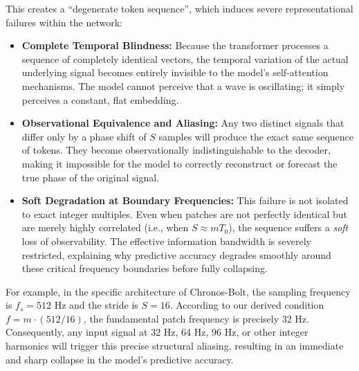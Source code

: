 This creates a ``degenerate token sequence'', which induces severe representational failures within the network:

\begin{itemize}
    \item \textbf{Complete Temporal Blindness:} Because the transformer processes a sequence of completely identical vectors, the temporal variation of the actual underlying signal becomes entirely invisible to the model's self-attention mechanisms. The model cannot perceive that a wave is oscillating; it simply perceives a constant, flat embedding.
    \item \textbf{Observational Equivalence and Aliasing:} Any two distinct signals that differ only by a phase shift of $S$ samples will produce the exact same sequence of tokens. They become observationally indistinguishable to the decoder, making it impossible for the model to correctly reconstruct or forecast the true phase of the original signal.
    \item \textbf{Soft Degradation at Boundary Frequencies:} This failure is not isolated to exact integer multiples. Even when patches are not perfectly identical but are merely highly correlated (i.e., when $S \approx m T_0$), the sequence suffers a \emph{soft} loss of observability. The effective information bandwidth is severely restricted, explaining why predictive accuracy degrades smoothly around these critical frequency boundaries before fully collapsing.
\end{itemize}

For example, in the specific architecture of Chronos-Bolt, the sampling frequency is $f_s = 512$ Hz and the stride is $S=16$. According to our derived condition $f = m \cdot (512/16)$, the fundamental patch frequency is precisely 32 Hz. Consequently, any input signal at 32 Hz, 64 Hz, 96 Hz, or other integer harmonics will trigger this precise structural aliasing, resulting in an immediate and sharp collapse in the model's predictive accuracy.